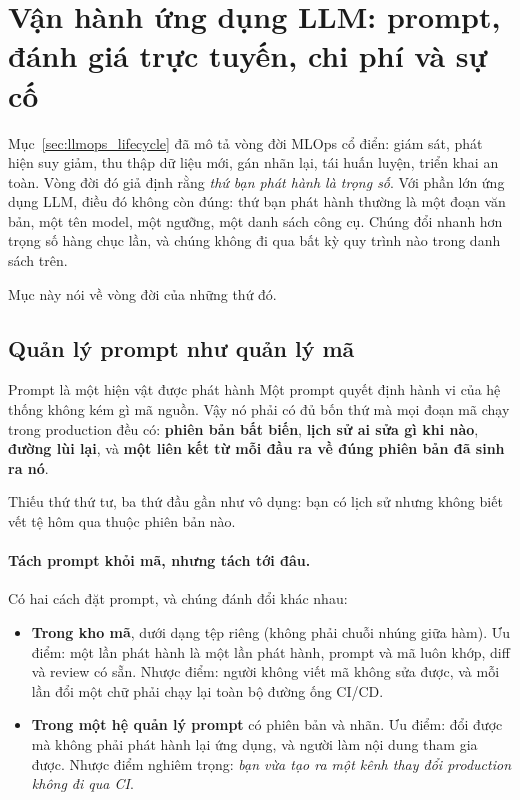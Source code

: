 
\section{Vận hành ứng dụng LLM: prompt, đánh giá trực tuyến, chi phí và sự cố}
\label{sec:llmops_app}

Mục~\ref{sec:llmops_lifecycle} đã mô tả vòng đời MLOps cổ điển: giám sát, phát hiện suy giảm, thu thập dữ liệu mới, gán nhãn lại, tái huấn luyện, triển khai an toàn. Vòng đời đó giả định rằng \emph{thứ bạn phát hành là trọng số}. Với phần lớn ứng dụng LLM, điều đó không còn đúng: thứ bạn phát hành thường là một đoạn văn bản, một tên model, một ngưỡng, một danh sách công cụ. Chúng đổi nhanh hơn trọng số hàng chục lần, và chúng không đi qua bất kỳ quy trình nào trong danh sách trên.

Mục này nói về vòng đời của những thứ đó.

\subsection{Quản lý prompt như quản lý mã}
\label{ssec:prompt_management}

\begin{keyidea}{Prompt là một hiện vật được phát hành}
Một prompt quyết định hành vi của hệ thống không kém gì mã nguồn. Vậy nó phải có đủ bốn thứ mà mọi đoạn mã chạy trong production đều có: \textbf{phiên bản bất biến}, \textbf{lịch sử ai sửa gì khi nào}, \textbf{đường lùi lại}, và \textbf{một liên kết từ mỗi đầu ra về đúng phiên bản đã sinh ra nó}.

Thiếu thứ thứ tư, ba thứ đầu gần như vô dụng: bạn có lịch sử nhưng không biết vết tệ hôm qua thuộc phiên bản nào.
\end{keyidea}

\paragraph{Tách prompt khỏi mã, nhưng tách tới đâu.} Có hai cách đặt prompt, và chúng đánh đổi khác nhau:

\begin{itemize}
	\item \textbf{Trong kho mã}, dưới dạng tệp riêng (không phải chuỗi nhúng giữa hàm). Ưu điểm: một lần phát hành là một lần phát hành, prompt và mã luôn khớp, diff và review có sẵn. Nhược điểm: người không viết mã không sửa được, và mỗi lần đổi một chữ phải chạy lại toàn bộ đường ống CI/CD.
	\item \textbf{Trong một hệ quản lý prompt} có phiên bản và nhãn. Ưu điểm: đổi được mà không phải phát hành lại ứng dụng, và người làm nội dung tham gia được. Nhược điểm nghiêm trọng: \emph{bạn vừa tạo ra một kênh thay đổi production không đi qua CI}.
\end{itemize}

